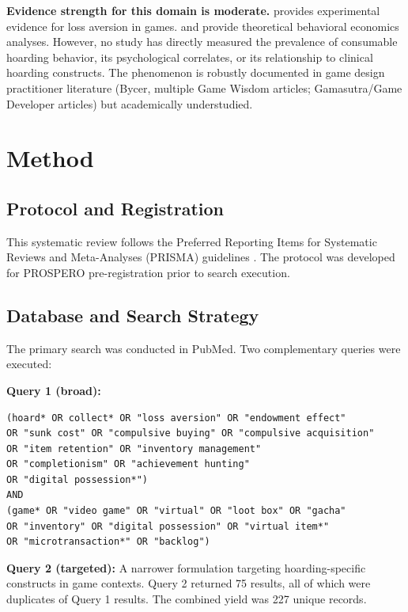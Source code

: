 \documentclass[12pt]{article}
\begin{document}
\textbf{Evidence strength for this domain is moderate.} \citet{Phillips2020} provides experimental evidence for loss aversion in games. \citet{Toh2021} and \citet{Engelstein2020} provide theoretical behavioral economics analyses. However, no study has directly measured the prevalence of consumable hoarding behavior, its psychological correlates, or its relationship to clinical hoarding constructs. The phenomenon is robustly documented in game design practitioner literature (Bycer, multiple Game Wisdom articles; Gamasutra/Game Developer articles) but academically understudied.

\section{Method}

\subsection{Protocol and Registration}

This systematic review follows the Preferred Reporting Items for Systematic Reviews and Meta-Analyses (PRISMA) guidelines \citep{Page2021}. The protocol was developed for PROSPERO pre-registration prior to search execution.

\subsection{Database and Search Strategy}

The primary search was conducted in PubMed. Two complementary queries were executed:

\textbf{Query 1 (broad):}

\begin{verbatim}
(hoard* OR collect* OR "loss aversion" OR "endowment effect"
OR "sunk cost" OR "compulsive buying" OR "compulsive acquisition"
OR "item retention" OR "inventory management"
OR "completionism" OR "achievement hunting"
OR "digital possession*")
AND
(game* OR "video game" OR "virtual" OR "loot box" OR "gacha"
OR "inventory" OR "digital possession" OR "virtual item*"
OR "microtransaction*" OR "backlog")
\end{verbatim}

\textbf{Query 2 (targeted):} A narrower formulation targeting hoarding-specific constructs in game contexts. Query 2 returned 75 results, all of which were duplicates of Query 1 results. The combined yield was 227 unique records.
\end{document}
